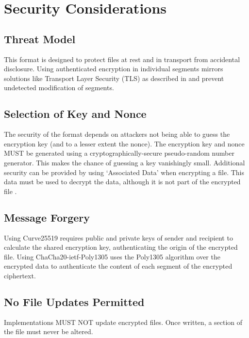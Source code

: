 \section{Security Considerations}
\subsection{Threat Model}
This format is designed to protect files at rest and in transport from
accidental disclosure.
%
Using authenticated encryption in individual segments mirrors
solutions like Transport Layer Security (TLS) as described in
\cite{RFC5246} and prevent undetected modification of segments.

\subsection{Selection of Key and Nonce}
The security of the format depends on attackers not being able to
guess the encryption key (and to a lesser extent the nonce).
%
The encryption key and nonce MUST be generated using a
cryptographically-secure pseudo-random number generator.
%
This makes the chance of guessing a key vanishingly small.
%
Additional security can be provided by using `Associated Data' when
encrypting a file.
%
This data must be used to decrypt the data, although it is not part of
the encrypted file \cite{RFC8439}.

\subsection{Message Forgery}
Using Curve25519 requires public and private keys of sender and
recipient to calculate the shared encryption key, authenticating the
origin of the encrypted file.
%
Using ChaCha20-ietf-Poly1305 uses the Poly1305 algorithm over the
encrypted data to authenticate the content of each segment of the
encrypted ciphertext.

\subsection{No File Updates Permitted}
Implementations MUST NOT update encrypted files.
%
Once written, a section of the file must never be altered.
